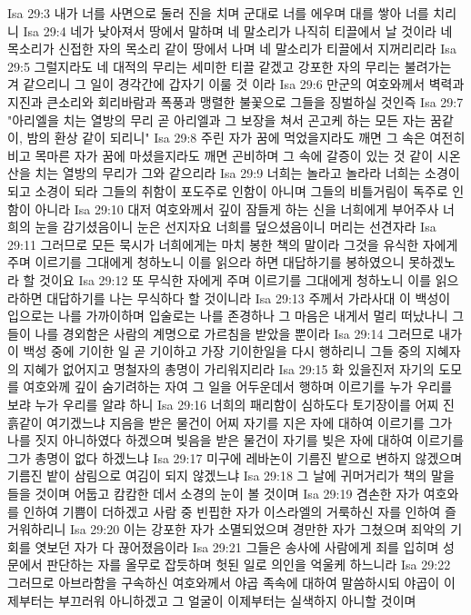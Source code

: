 Isa 29:3  내가 너를 사면으로 둘러 진을 치며 군대로 너를 에우며 대를 쌓아 너를 치리니
Isa 29:4  네가 낮아져서 땅에서 말하며 네 말소리가 나직히 티끌에서 날 것이라 네 목소리가 신접한 자의 목소리 같이 땅에서 나며 네 말소리가 티끌에서 지꺼리리라
Isa 29:5  그럴지라도 네 대적의 무리는 세미한 티끌 같겠고 강포한 자의 무리는 불려가는 겨 같으리니 그 일이 경각간에 갑자기 이룰 것 이라
Isa 29:6  만군의 여호와께서 벽력과 지진과 큰소리와 회리바람과 폭풍과 맹렬한 불꽃으로 그들을 징벌하실 것인즉
Isa 29:7  "아리엘을 치는 열방의 무리 곧 아리엘과 그 보장을 쳐서 곤고케 하는 모든 자는 꿈같이, 밤의 환상 같이 되리니"
Isa 29:8  주린 자가 꿈에 먹었을지라도 깨면 그 속은 여전히 비고 목마른 자가 꿈에 마셨을지라도 깨면 곤비하며 그 속에 갈증이 있는 것 같이 시온산을 치는 열방의 무리가 그와 같으리라
Isa 29:9  너희는 놀라고 놀라라 너희는 소경이 되고 소경이 되라 그들의 취함이 포도주로 인함이 아니며 그들의 비틀거림이 독주로 인함이 아니라
Isa 29:10  대저 여호와께서 깊이 잠들게 하는 신을 너희에게 부어주사 너희의 눈을 감기셨음이니 눈은 선지자요 너희를 덮으셨음이니 머리는 선견자라
Isa 29:11  그러므로 모든 묵시가 너희에게는 마치 봉한 책의 말이라 그것을 유식한 자에게 주며 이르기를 그대에게 청하노니 이를 읽으라 하면 대답하기를 봉하였으니 못하겠노라 할 것이요
Isa 29:12  또 무식한 자에게 주며 이르기를 그대에게 청하노니 이를 읽으라하면 대답하기를 나는 무식하다 할 것이니라
Isa 29:13  주께서 가라사대 이 백성이 입으로는 나를 가까이하며 입술로는 나를 존경하나 그 마음은 내게서 멀리 떠났나니 그들이 나를 경외함은 사람의 계명으로 가르침을 받았을 뿐이라
Isa 29:14  그러므로 내가 이 백성 중에 기이한 일 곧 기이하고 가장 기이한일을 다시 행하리니 그들 중의 지혜자의 지혜가 없어지고 명철자의 총명이 가리워지리라
Isa 29:15  화 있을진저 자기의 도모를 여호와께 깊이 숨기려하는 자여 그 일을 어두운데서 행하며 이르기를 누가 우리를 보랴 누가 우리를 알랴 하니
Isa 29:16  너희의 패리함이 심하도다 토기장이를 어찌 진흙같이 여기겠느냐 지음을 받은 물건이 어찌 자기를 지은 자에 대하여 이르기를 그가 나를 짓지 아니하였다 하겠으며 빚음을 받은 물건이 자기를 빚은 자에 대하여 이르기를 그가 총명이 없다 하겠느냐
Isa 29:17  미구에 레바논이 기름진 밭으로 변하지 않겠으며 기름진 밭이 삼림으로 여김이 되지 않겠느냐
Isa 29:18  그 날에 귀머거리가 책의 말을 들을 것이며 어둡고 캄캄한 데서 소경의 눈이 볼 것이며
Isa 29:19  겸손한 자가 여호와를 인하여 기쁨이 더하겠고 사람 중 빈핍한 자가 이스라엘의 거룩하신 자를 인하여 즐거워하리니
Isa 29:20  이는 강포한 자가 소멸되었으며 경만한 자가 그쳤으며 죄악의 기회를 엿보던 자가 다 끊어졌음이라
Isa 29:21  그들은 송사에 사람에게 죄를 입히며 성문에서 판단하는 자를 올무로 잡듯하며 헛된 일로 의인을 억울케 하느니라
Isa 29:22  그러므로 아브라함을 구속하신 여호와께서 야곱 족속에 대하여 말씀하시되 야곱이 이제부터는 부끄러워 아니하겠고 그 얼굴이 이제부터는 실색하지 아니할 것이며
